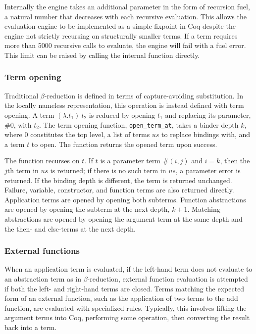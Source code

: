 \documentclass[12pt]{article}
\begin{document}
Internally the engine takes an additional parameter in the form of
recursion fuel, a natural number that decreases with each recursive
evaluation.  This allows the evaluation engine to be implemented as a
simple fixpoint in Coq despite the engine not strictly recursing on
structurally smaller terms.  If a term requires more than 5000
recursive calls to evaluate, the engine will fail with a fuel error.
This limit can be raised by calling the internal function directly.

\subsubsection{Term opening}

Traditional $\beta$-reduction is defined in terms of capture-avoiding
substitution.  In the locally nameless representation, this operation is
instead defined with term opening.  A term $(\lambda. t_1)\ t_2$ is
reduced by opening $t_1$ and replacing its parameter, $\#0$, with $t_2$.
The term opening function, \texttt{open\_term\_at}, takes a binder
depth $k$, where 0 constitutes the top level, a list of terms $us$ to
replace bindings with, and a term $t$ to open. The function returns the
opened term upon success.

The function recurses on $t$.  If $t$ is a parameter term $\#(i, j)$ and
$i = k$, then the $j$th term in $us$ is returned; if there is no such
term in $us$, a parameter error is returned.  If the binding depth is
different, the term is returned unchanged.  Failure, variable,
constructor, and function terms are also returned directly.  Application
terms are opened by opening both subterms.  Function abstractions are
opened by opening the subterm at the next depth, $k + 1$.  Matching
abstractions are opened by opening the argument term at the same depth
and the then- and else-terms at the next depth.

\subsubsection{External functions}

When an application term is evaluated, if the left-hand term does not
evaluate to an abstraction term as in $\beta$-reduction, external
function evaluation is attempted if both the left- and right-hand terms
are closed.  Terms matching the expected form of an external function,
such as the application of two terms to the add function, are evaluated
with specialized rules.  Typically, this involves lifting the argument
terms into Coq, performing some operation, then converting the result
back into a term.
\end{document}
